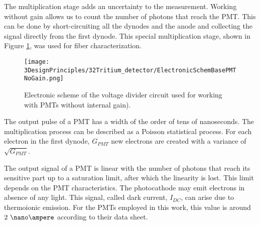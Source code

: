 \begin{enumerate}
The multiplication stage adds an uncertainty to the measurement. Working without gain allows us to count the number of photons that reach the PMT. This can be done by short-circuiting all the dynodes and the anode and collecting the signal directly from the first dynode. This special multiplication stage, shown in Figure \ref{fig:ElectronicSchemeBasePMTNoGain}, was used for fiber characterization.

\begin{figure}[htbp]
\centering
\texttt{[image: 3DesignPrinciples/32Tritium\_detector/ElectronicSchemBasePMTNoGain.png]}
\caption{Electronic scheme of the voltage divider circuit used for working with PMTs without internal gain).\label{fig:ElectronicSchemeBasePMTNoGain}}
\end{figure}


\end{enumerate}

The output pulse of a PMT has a width of the order of tens of nanoseconds. The multiplication process can be described as a Poisson statistical process. For each electron in the first dynode, $G_{PMT}$ new electrons are created with a variance of $\sqrt{G_{PMT}}$.

The output signal of a PMT is linear with the number of photons that reach its sensitive part up to a saturation limit, after which the linearity is lost. This limit depends on the PMT characteristics. The photocathode may emit electrons in absence of any light. This signal, called dark current, $I_{DC}$, can  arise due to thermoionic emission. For the PMTs employed in this work, this value is around $2~\nano\ampere$ according to their data sheet.

